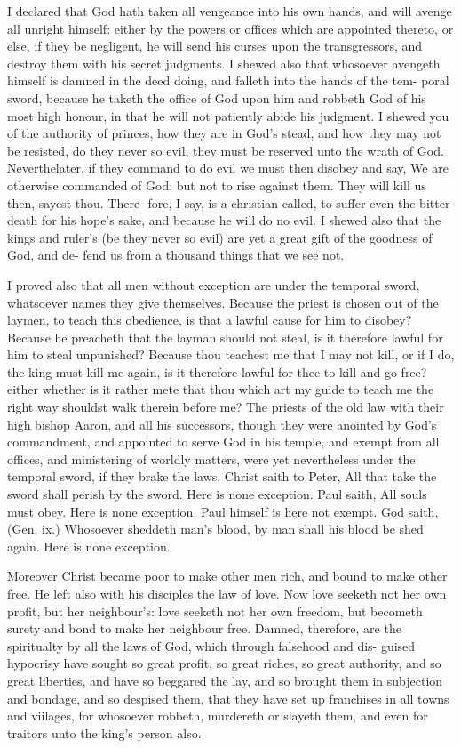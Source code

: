 \documentclass{custom}
\begin{document}
I declared that God hath taken all vengeance into his 
own hands, and will avenge all unright himself: either by 
the powers or offices which are appointed thereto, or else, 
if they be negligent, he will send his curses upon the 
transgressors, and destroy them with his secret judgments. 
I shewed also that whosoever avengeth himself is damned 
in the deed doing, and falleth into the hands of the tem- 
poral sword, because he taketh the office of God upon him 
and robbeth God of his most high honour, in that he will 
not patiently abide his judgment. I shewed you of the 
authority of princes, how they are in God's stead, and how 
they may not be resisted, do they never so evil, they must 
be reserved unto the wrath of God. Neverthelater, if 
they command to do evil we must then disobey and say, 
We are otherwise commanded of God: but not to rise 
against them. They will kill us then, sayest thou. There- 
fore, I say, is a christian called, to suffer even the bitter 
death for his hope's sake, and because he will do no evil. 
I shewed also that the kings and ruler's (be they never so 
evil) are yet a great gift of the goodness of God, and de- 
fend us from a thousand things that we see not. 

I proved also that all men without exception are under 
the temporal sword, whatsoever names they give themselves. 
Because the priest is chosen out of the laymen, to teach 
this obedience, is that a lawful cause for him to disobey? 
Because he preacheth that the layman should not steal, is 
it therefore lawful for him to steal unpunished? Because 
thou teachest me that I may not kill, or if I do, the king 
must kill me again, is it therefore lawful for thee to kill 
and go free? either whether is it rather mete that thou 
which art my guide to teach me the right way shouldst 
walk therein before me? The priests of the old law with 
their high bishop Aaron, and all his successors, though 
they were anointed by God's commandment, and appointed 
to serve God in his temple, and exempt from all offices, 
and ministering of worldly matters, were yet nevertheless 
under the temporal sword, if they brake the laws. Christ 
saith to Peter, All that take the sword shall perish by the 
sword. Here is none exception. Paul saith, All souls 
must obey. Here is none exception. Paul himself is 
here not exempt. God saith, (Gen. ix.) Whosoever 
sheddeth man's blood, by man shall his blood be shed 
again. Here is none exception. 

Moreover Christ became poor to make other men rich, 
and bound to make other free. He left also with his 
disciples the law of love. Now love seeketh not her own 
profit, but her neighbour's: love seeketh not her own 
freedom, but becometh surety and bond to make her 
neighbour free. Damned, therefore, are the spiritualty 
by all the laws of God, which through falsehood and dis- 
guised hypocrisy have sought so great profit, so great 
riches, so great authority, and so great liberties, and have 
so beggared the lay, and so brought them in subjection 
and bondage, and so despised them, that they have set up 
franchises in all towns and viilages, for whosoever robbeth, 
murdereth or slayeth them, and even for traitors unto the 
king's person also. 
\end{document}
